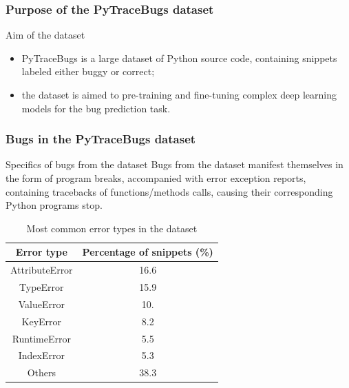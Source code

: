 \documentclass{beamer}
\begin{document}
\begin{frame}
\frametitle{Purpose of the PyTraceBugs dataset}

\begin{block}{Aim of the dataset}
\begin{itemize}
\item PyTraceBugs is a large dataset of Python source code, containing snippets labeled either buggy or correct;
\item the dataset is aimed to pre-training
and fine-tuning complex deep learning models for the bug prediction task.
\end{itemize}
\end{block}

\end{frame}

\begin{frame}
\frametitle{Bugs in the PyTraceBugs dataset}

\begin{block}{Specifics of bugs from the dataset}
Bugs from the dataset manifest themselves in the form of program breaks, accompanied with
error exception reports, containing tracebacks of functions/methods calls, causing their corresponding Python programs stop.
\end{block}

{\tiny
\begin{table}[htbp]
\caption{Most common error types in the dataset}
\begin{center}
\renewcommand{\arraystretch}{1.2}
\begin{tabular}{|c|c|}
\hline
  Error type  & Percentage of snippets (\%) \\
\hline
  AttributeError & 16.6 \\
\hline
  TypeError & 15.9 \\
\hline
  ValueError & 10. \\
\hline
  KeyError & 8.2 \\
\hline
  RuntimeError & 5.5 \\
\hline
  IndexError &  5.3 \\
\hline
  Others &  38.3 \\
\hline
\end{tabular}
\label{tab1}
\end{center}
\end{table}}

\end{frame}
\end{document}
